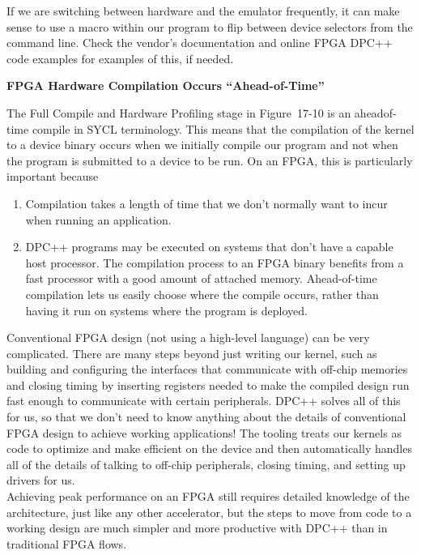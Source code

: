 If we are switching between hardware and the emulator frequently, it can make sense to use a macro within our program to flip between device selectors from the command line. Check the vendor’s documentation and online FPGA DPC++ code examples for examples of this, if needed.\par

\hspace*{\fill} \par %
\textbf{FPGA Hardware Compilation Occurs “Ahead-of-Time”}

The Full Compile and Hardware Profiling stage in Figure 17-10 is an aheadof-time compile in SYCL terminology. This means that the compilation of the kernel to a device binary occurs when we initially compile our program and not when the program is submitted to a device to be run. On an FPGA, this is particularly important because\par

\begin{enumerate}
	\item Compilation takes a length of time that we don’t normally want to incur when running an application.
	\item DPC++ programs may be executed on systems that don’t have a capable host processor. The compilation process to an FPGA binary benefits from a fast processor with a good amount of attached memory. Ahead-of-time compilation lets us easily choose where the compile occurs, rather than having it run on systems where the program is deployed.
\end{enumerate}

\begin{tcolorbox}[colback=blue!5!white,colframe=blue!75!black, title=A LOT HAPPENS BEHIND THE SCENES WITH DPC++ ON AN FPGA!]
Conventional FPGA design (not using a high-level language) can be very complicated. There are many steps beyond just writing our kernel, such as building and configuring the interfaces that communicate with off-chip memories and closing timing by inserting registers needed to make the compiled design run fast enough to communicate with certain peripherals. DPC++ solves all of this for us, so that we don’t need to know anything about the details of conventional FPGA design to achieve working applications! The tooling treats our kernels as code to optimize and make efficient on the device and then automatically handles all of the details of talking to off-chip peripherals, closing timing, and setting up drivers for us.\\

Achieving peak performance on an FPGA still requires detailed knowledge of the architecture, just like any other accelerator, but the steps to move from code to a working design are much simpler and more productive with DPC++ than in traditional FPGA flows.
\end{tcolorbox}



















